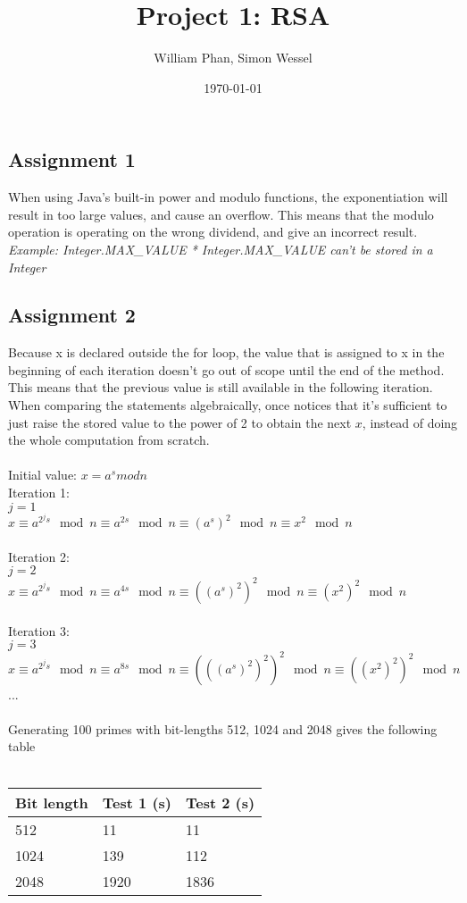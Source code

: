 \documentclass[11pt,a4paper]{article}
\title{Project 1: RSA} %
\author{William Phan, Simon Wessel}
\date{\today} %
\begin{document}
\maketitle %

\setcounter{secnumdepth}{0}

\subsection{Assignment 1}
When using Java's built-in power and modulo functions, the exponentiation will result in too large values, and cause an overflow. This means that the modulo operation is operating on the wrong dividend, and give an incorrect result. 
\\
\textit{Example: Integer.MAX\_VALUE * Integer.MAX\_VALUE can't be stored in a Integer}

\subsection{Assignment 2}
Because x is declared outside the for loop, the value that is assigned to x in the beginning of each iteration doesn't go out of scope until the end of the method. This means that the previous value is still available in the following iteration. When comparing the statements algebraically, once notices that it's sufficient to just raise the stored value to the power of 2 to obtain the next $x$, instead of doing the whole computation from scratch.
\\\\
Initial value: $x = a^s mod n$ \\
Iteration 1: \\
$j = 1$ \\
$x \equiv a^{ 2^j s } \mod n \equiv a^{ 2s } \mod n \equiv (a^s)^2 \mod n \equiv x^2 \mod n$ \\\\
Iteration 2: \\
$j = 2$ \\
$x \equiv a^{ 2^j s } \mod n \equiv a^{ 4s } \mod n \equiv ((a^s)^2)^2 \mod n \equiv (x^2)^2 \mod n$ \\\\
Iteration 3: \\
$j = 3$ \\
$x \equiv a^{ 2^j s } \mod n \equiv a^{ 8s } \mod n \equiv (((a^s)^2)^2)^2 \mod n \equiv ((x^2)^2)^2 \mod n$ \\
...
\\\\
Generating 100 primes with bit-lengths 512, 1024 and 2048 gives the following table \\\\
\begin{tabular}{ l | l | l }
	Bit length & Test 1 (s) & Test 2 (s)\\ \hline
	512 & 11 & 11\\
	1024 & 139 & 112\\
	2048 & 1920 & 1836\\
\end{tabular}
\\\\
\end{document}

